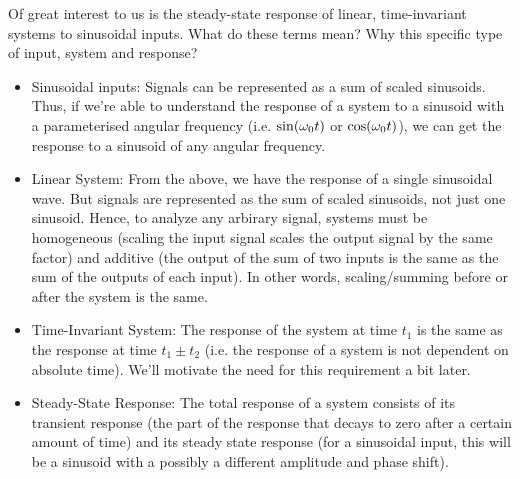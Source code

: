\documentclass{report}
\begin{document}
Of great interest to us is the steady-state response of linear, time-invariant systems to sinusoidal inputs. What do these terms mean? Why this specific type of input, system and response? 
\begin{itemize}
    \item Sinusoidal inputs: Signals can be represented as a sum of scaled sinusoids. Thus, if we're able to understand the response of a system to a sinusoid with a parameterised angular frequency (i.e. $\sin(\omega_{0}t)$ or $\cos(\omega_{0}t)$), we can get the response to a sinusoid of any angular frequency. 
    \item Linear System: From the above, we have the response of a single sinusoidal wave. But signals are represented as the sum of scaled sinusoids, not just one sinusoid. Hence, to analyze any arbirary signal, systems must be homogeneous (scaling the input signal scales the output signal by the same factor) and additive (the output of the sum of two inputs is the same as the sum of the outputs of each input). In other words, scaling/summing before or after the system is the same.
    \item Time-Invariant System: The response of the system at time $t_{1}$ is the same as the response at time $t_{1} \pm t_{2}$ (i.e. the response of a system is not dependent on absolute time). We'll motivate the need for this requirement a bit later.
    \item Steady-State Response: The total response of a system consists of its transient response (the part of the response that decays to zero after a certain amount of time) and its steady state response (for a sinusoidal input, this will be a sinusoid with a possibly a different amplitude and phase shift). 

\end{itemize}



\end{document}
